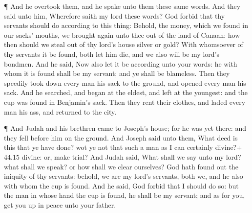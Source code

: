  ¶ And he overtook them, and he spake unto them these same
words.  And they said unto him, Wherefore saith my lord
these words? God forbid that thy servants should do according to this
thing:  Behold, the money, which we found in our sacks'
mouths, we brought again unto thee out of the land of Canaan: how then
should we steal out of thy lord's house silver or gold? 
With whomsoever of thy servants it be found, both let him die, and we
also will be my lord's bondmen.  And he said, Now also let
it be according unto your words: he with whom it is found shall be my
servant; and ye shall be blameless.  Then they speedily
took down every man his sack to the ground, and opened every man his
sack.  And he searched, and began at the eldest, and left
at the youngest: and the cup was found in Benjamin's sack. 
Then they rent their clothes, and laded every man his ass, and returned
to the city.

 ¶ And Judah and his brethren came to Joseph's house; for
he was yet there: and they fell before him on the ground. 
And Joseph said unto them, What deed is this that ye have done? wot ye
not that such a man as I can certainly divine?+ 44.15 divine: or, make
trial?  And Judah said, What shall we say unto my lord?
what shall we speak? or how shall we clear ourselves? God hath found out
the iniquity of thy servants: behold, we are my lord's servants, both
we, and he also with whom the cup is found.  And he said,
God forbid that I should do so: but the man in whose hand the cup is
found, he shall be my servant; and as for you, get you up in peace unto
your father.

